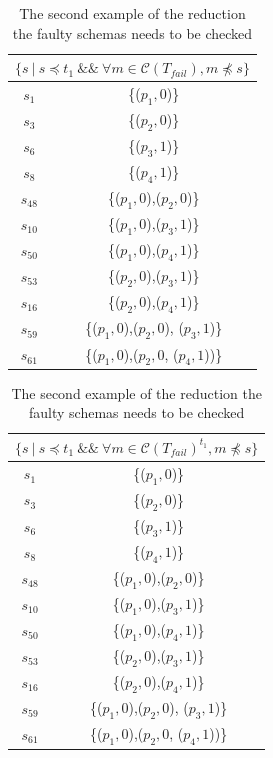 \begin{table}[htbp]
  \centering
  \caption{The second example of the reduction the faulty schemas needs to be checked}
  \label{ex:mfssintequal}
    \begin{tabular}{|c|c|} \hline
     \multicolumn{2}{|c|}{$\{ s\ |\ s \preceq t_{1}\ \&\&\ \forall m \in \mathcal{C}(T_{fail}),  m \npreceq s \}$} \\ \hline
   $s_{1}$ & \{($p_{1}, 0$)\} \\
   $s_{3}$ & \{($p_{2}, 0$)\} \\
   $s_{6}$ & \{($p_{3}, 1$)\} \\
   $s_{8}$ & \{($p_{4}, 1$)\} \\

   $s_{48}$ & \{($p_{1}, 0$),($p_{2}, 0$)\} \\

   $s_{10}$ & \{($p_{1}, 0$),($p_{3}, 1$)\} \\
   $s_{50}$ & \{($p_{1}, 0$),($p_{4}, 1$)\} \\

   $s_{53}$ & \{($p_{2}, 0$),($p_{3}, 1$)\} \\
   $s_{16}$ & \{($p_{2}, 0$),($p_{4}, 1$)\} \\

   $s_{59}$ & \{($p_{1}, 0$),($p_{2}, 0$), ($p_{3}, 1$)\} \\
   $s_{61}$ & \{($p_{1}, 0$),($p_{2}, 0$,  ($p_{4}, 1$))\} \\

    \hline
    \end{tabular}%
\quad
    \begin{tabular}{|c|c|} \hline
   \multicolumn{2}{|c|}{$\{ s\ |\ s \preceq t_{1}\ \&\&\ \forall m \in \mathcal{C}(T_{fail})^{t_{1}},  m \npreceq s \}$}\\ \hline
   $s_{1}$ & \{($p_{1}, 0$)\} \\
   $s_{3}$ & \{($p_{2}, 0$)\} \\
   $s_{6}$ & \{($p_{3}, 1$)\} \\
   $s_{8}$ & \{($p_{4}, 1$)\} \\

   $s_{48}$ & \{($p_{1}, 0$),($p_{2}, 0$)\} \\

   $s_{10}$ & \{($p_{1}, 0$),($p_{3}, 1$)\} \\
   $s_{50}$ & \{($p_{1}, 0$),($p_{4}, 1$)\} \\

   $s_{53}$ & \{($p_{2}, 0$),($p_{3}, 1$)\} \\
   $s_{16}$ & \{($p_{2}, 0$),($p_{4}, 1$)\} \\

   $s_{59}$ & \{($p_{1}, 0$),($p_{2}, 0$), ($p_{3}, 1$)\} \\
   $s_{61}$ & \{($p_{1}, 0$),($p_{2}, 0$,  ($p_{4}, 1$))\} \\ \hline
    \end{tabular}%
\end{table}



